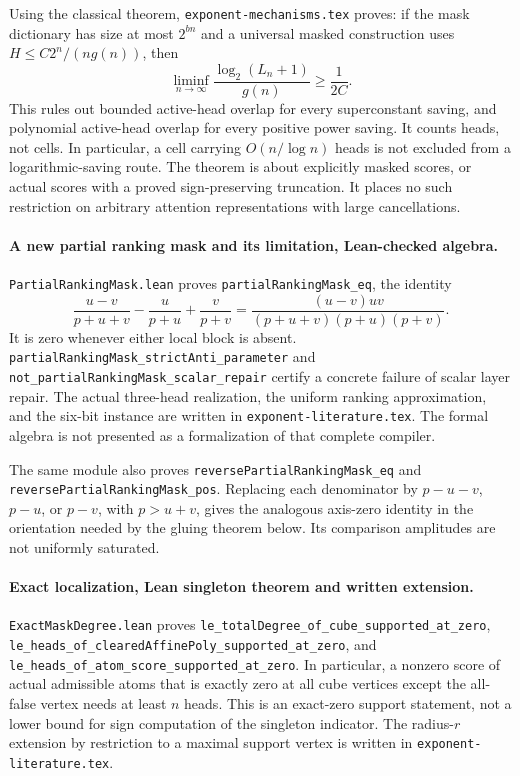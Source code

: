 \documentclass[11pt]{article}
\begin{document}
Using the classical theorem, \texttt{exponent-mechanisms.tex} proves:
if the mask dictionary has size at most $2^{bn}$ and a universal
masked construction uses $H\leq C2^n/(ng(n))$, then
\[
 \liminf_{n\to\infty}
 \frac{\log_2(L_n+1)}{g(n)}\geq\frac1{2C}.
\]
This rules out bounded active-head overlap for every superconstant
saving, and polynomial active-head overlap for every positive power
saving. It counts heads, not cells. In particular, a cell carrying
$O(n/\log n)$ heads is not excluded from a logarithmic-saving route.
The theorem is about explicitly masked scores, or actual scores with
a proved sign-preserving truncation. It places no such restriction
on arbitrary attention representations with large cancellations.

\paragraph{A new partial ranking mask and its limitation, Lean-checked algebra.}
\texttt{PartialRankingMask.lean} proves
\texttt{partialRankingMask\_eq}, the identity
\[
 \frac{u-v}{p+u+v}-\frac{u}{p+u}+\frac{v}{p+v}
 =\frac{(u-v)uv}{(p+u+v)(p+u)(p+v)}.
\]
It is zero whenever either local block is absent.
\texttt{partialRankingMask\_strictAnti\_parameter} and
\texttt{not\_partialRankingMask\_scalar\_repair} certify a concrete
failure of scalar layer repair. The actual three-head realization,
the uniform ranking approximation, and the six-bit instance are
written in \texttt{exponent-literature.tex}. The formal algebra is
not presented as a formalization of that complete compiler.

The same module also proves \texttt{reversePartialRankingMask\_eq}
and \texttt{reversePartialRankingMask\_pos}. Replacing each denominator
by $p-u-v$, $p-u$, or $p-v$, with $p>u+v$, gives the analogous
axis-zero identity in the orientation needed by the gluing theorem
below. Its comparison amplitudes are not uniformly saturated.

\paragraph{Exact localization, Lean singleton theorem and written extension.}
\texttt{ExactMaskDegree.lean} proves
\texttt{le\_totalDegree\_of\_cube\_supported\_at\_zero},
\texttt{le\_heads\_of\_clearedAffinePoly\_supported\_at\_zero}, and
\texttt{le\_heads\_of\_atom\_score\_supported\_at\_zero}.
In particular, a nonzero score of actual admissible atoms that is
exactly zero at all cube vertices except the all-false vertex needs
at least $n$ heads. This is an exact-zero support statement, not a
lower bound for sign computation of the singleton indicator. The
radius-$r$ extension by restriction to a maximal support vertex is
written in \texttt{exponent-literature.tex}.
\end{document}
